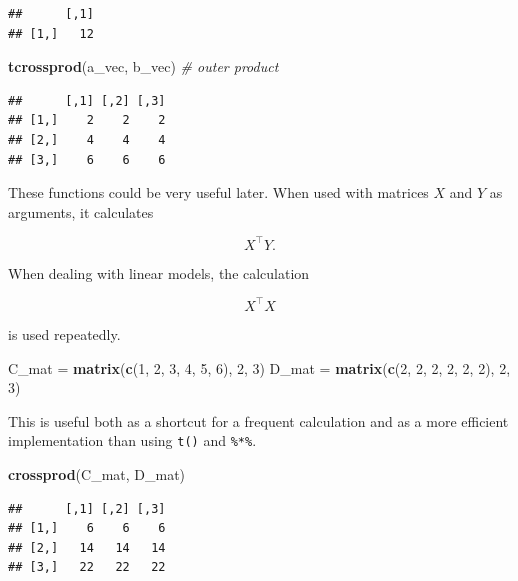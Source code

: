 \documentclass[]{book}
\newenvironment{Shaded}{\begin{snugshade}}{\end{snugshade}}
\newcommand{\KeywordTok}[1]{\textcolor[rgb]{0.13,0.29,0.53}{\textbf{#1}}}
\newcommand{\DecValTok}[1]{\textcolor[rgb]{0.00,0.00,0.81}{#1}}
\newcommand{\StringTok}[1]{\textcolor[rgb]{0.31,0.60,0.02}{#1}}
\newcommand{\CommentTok}[1]{\textcolor[rgb]{0.56,0.35,0.01}{\textit{#1}}}
\newcommand{\NormalTok}[1]{#1}
\theoremstyle{definition}
\theoremstyle{definition}
\theoremstyle{definition}
\theoremstyle{remark}
\begin{document}
\begin{verbatim}
##      [,1]
## [1,]   12
\end{verbatim}

\begin{Shaded}
\begin{Highlighting}[]
\KeywordTok{tcrossprod}\NormalTok{(a_vec, b_vec)  }\CommentTok{# outer product}
\end{Highlighting}
\end{Shaded}

\begin{verbatim}
##      [,1] [,2] [,3]
## [1,]    2    2    2
## [2,]    4    4    4
## [3,]    6    6    6
\end{verbatim}

These functions could be very useful later. When used with matrices
\(X\) and \(Y\) as arguments, it calculates

\[
X^\top Y.
\]

When dealing with linear models, the calculation

\[
X^\top X
\]

is used repeatedly.

\begin{Shaded}
\begin{Highlighting}[]
\NormalTok{C_mat =}\StringTok{ }\KeywordTok{matrix}\NormalTok{(}\KeywordTok{c}\NormalTok{(}\DecValTok{1}\NormalTok{, }\DecValTok{2}\NormalTok{, }\DecValTok{3}\NormalTok{, }\DecValTok{4}\NormalTok{, }\DecValTok{5}\NormalTok{, }\DecValTok{6}\NormalTok{), }\DecValTok{2}\NormalTok{, }\DecValTok{3}\NormalTok{)}
\NormalTok{D_mat =}\StringTok{ }\KeywordTok{matrix}\NormalTok{(}\KeywordTok{c}\NormalTok{(}\DecValTok{2}\NormalTok{, }\DecValTok{2}\NormalTok{, }\DecValTok{2}\NormalTok{, }\DecValTok{2}\NormalTok{, }\DecValTok{2}\NormalTok{, }\DecValTok{2}\NormalTok{), }\DecValTok{2}\NormalTok{, }\DecValTok{3}\NormalTok{)}
\end{Highlighting}
\end{Shaded}

This is useful both as a shortcut for a frequent calculation and as a
more efficient implementation than using \texttt{t()} and
\texttt{\%*\%}.

\begin{Shaded}
\begin{Highlighting}[]
\KeywordTok{crossprod}\NormalTok{(C_mat, D_mat)}
\end{Highlighting}
\end{Shaded}

\begin{verbatim}
##      [,1] [,2] [,3]
## [1,]    6    6    6
## [2,]   14   14   14
## [3,]   22   22   22
\end{verbatim}
\end{document}
